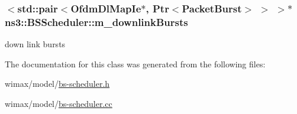 \subsubsection[{\texorpdfstring{m\+\_\+downlink\+Bursts}{m_downlinkBursts}}]{$<$std\+::pair$<${\bf Ofdm\+Dl\+Map\+Ie}$\ast$, {\bf Ptr}$<${\bf Packet\+Burst}$>$ $>$ $>$$\ast$ ns3\+::\+B\+S\+Scheduler\+::m\+\_\+downlink\+Bursts\hspace{0.3cm}{\ttfamily [private]}}\hypertarget{classns3_1_1BSScheduler_accda9459142f6d1479ccdc18dfe7e4f4}{}\label{classns3_1_1BSScheduler_accda9459142f6d1479ccdc18dfe7e4f4}


down link bursts 



The documentation for this class was generated from the following files\+:\begin{DoxyCompactItemize}
\item 
wimax/model/\hyperlink{bs-scheduler_8h}{bs-\/scheduler.\+h}\item 
wimax/model/\hyperlink{bs-scheduler_8cc}{bs-\/scheduler.\+cc}\end{DoxyCompactItemize}
